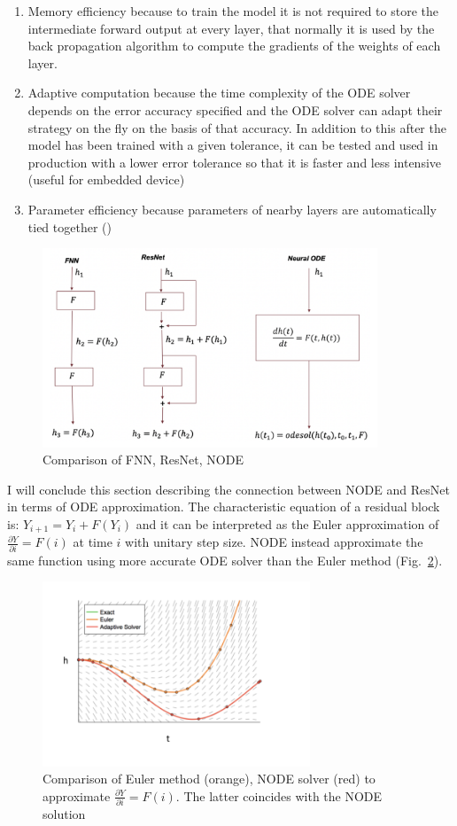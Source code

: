 \documentclass[LaM,binding=0.6cm]{sapthesis}
\begin{document}
\begin{enumerate}
\item Memory efficiency because to train the model it is not required to store the intermediate forward output at every layer, that normally it is used by the back propagation algorithm to compute the gradients of the weights of each layer.
\item Adaptive computation because the time complexity of the ODE solver depends on the error accuracy specified and the ODE solver can adapt their strategy on the fly on the basis of that accuracy.  In addition to this after the model has been trained with a given tolerance, it can be tested and used in production with a lower error tolerance so that it is faster and less intensive (useful for embedded device)
\item Parameter efficiency because parameters of nearby layers are automatically tied together (\cite{DBLP:journals/corr/abs-1806-07366})
\end{enumerate}
\begin{figure}[H]  \centering
	\includegraphics[width=100mm,scale=0.7]{cmplink.png}
	\caption{Comparison of FNN, ResNet, NODE}
	\label{fig:cmplink}
\end{figure}
I will conclude this section describing the connection between NODE and ResNet in terms of ODE approximation. The characteristic equation of a residual block is: $Y_{i+1} = Y_{i} +F(Y_{i})$ and it can be interpreted as the Euler approximation of $\frac{\partial Y}{\partial i} = F(i)$ at time $i$ with unitary step size. NODE instead approximate the same function using more accurate ODE solver than the Euler method (Fig.~\ref{fig:eulermethod}). 
\begin{figure}[H]  \centering
	\includegraphics[width=80mm,scale=0.7]{eulermethod.png}
	\caption{Comparison of Euler method (orange), NODE solver (red) to approximate  $\frac{\partial Y}{\partial i} = F(i)$. The latter coincides with the NODE solution }
	\label{fig:eulermethod}
\end{figure}
\end{document}
